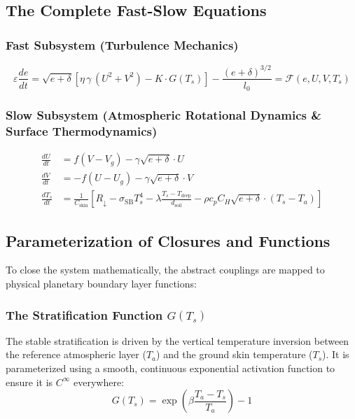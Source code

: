 \documentclass{article}
\begin{document}
\subsection{The Complete Fast-Slow Equations}
\label{subsec:fast_slow_eqs}

\subsubsection*{Fast Subsystem (Turbulence Mechanics)}
\begin{equation}
\varepsilon \frac{de}{dt} = \sqrt{e + \delta} \left[ \eta\,\gamma\,(U^2 + V^2) - K \cdot G(T_s) \right] - \frac{(e+\delta)^{3/2}}{l_0} = \mathcal{F}(e,U,V,T_s)
\label{eq:fast_subsystem}
\end{equation}

\subsubsection*{Slow Subsystem (Atmospheric Rotational Dynamics \& Surface Thermodynamics)}
\begin{align}
\frac{dU}{dt} &= f(V - V_g) - \gamma \sqrt{e + \delta} \cdot U \label{eq:slow_u} \\
\frac{dV}{dt} &= -f(U - U_g) - \gamma \sqrt{e + \delta} \cdot V \label{eq:slow_v} \\
\frac{dT_s}{dt} &= \frac{1}{C_{\text{skin}}} \left[ R_{\downarrow} - \sigma_{\text{SB}} T_s^4 - \lambda \frac{T_s - T_{\text{deep}}}{d_{\text{soil}}} - \rho c_p C_H \sqrt{e + \delta} \cdot (T_s - T_a) \right] \label{eq:slow_ts}
\end{align}

\subsection{Parameterization of Closures and Functions}
\label{subsec:closures}

To close the system mathematically, the abstract couplings are mapped to physical planetary boundary layer functions:

\subsubsection{The Stratification Function $G(T_s)$}
The stable stratification is driven by the vertical temperature inversion between the reference atmospheric layer ($T_a$) and the ground skin temperature ($T_s$). It is parameterized using a smooth, continuous exponential activation function to ensure it is $C^\infty$ everywhere:
\begin{equation}
G(T_s) = \exp\left( \beta \frac{T_a - T_s}{T_a} \right) - 1
\label{eq:stratification_func}
\end{equation}
\end{document}
